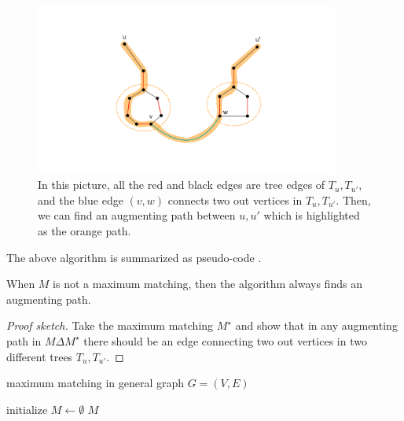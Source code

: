 \begin{itemize}
	\begin{figure}
		\centering
		\includegraphics[width=10cm]{fig/lecture_matching_augment}
		\caption{In this picture, all the red and black edges are tree edges of $T_u, T_{u'}$, and the blue edge $(v, w)$ connects two out vertices in $T_u, T_{u'}$. Then, we can find an augmenting path between $u, u'$ which is highlighted as the orange path.}
		\label{fig:augment}
	\end{figure}
\end{itemize}




The above algorithm is summarized as pseudo-code .
\begin{lemma}
	When $M$ is not a maximum matching, then the algorithm always finds an augmenting path.
\end{lemma}
\begin{proof}[Proof sketch]
	Take the maximum matching $M^\star$ and show that in any augmenting path in $M\Delta M^\star$ there should be an edge connecting two out vertices in two different trees $T_u, T_{u'}$.
\end{proof}

\begin{algorithm}
	\caption{maximum matching in general graph $G = (V, E)$}
	\label{alg:general-mcm}
	initialize $M\leftarrow \emptyset$\;
	\Return $M$\;
\end{algorithm}

